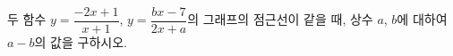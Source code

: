 두 함수 $y=\dfrac{-2x+1}{x+1}$, $y=\dfrac{bx-7}{2x+a}$의 그래프의 점근선이 같을 때, 상수 $a$, $b$에 대하여 $a-b$의 값을 구하시오.
